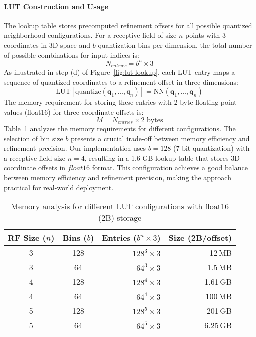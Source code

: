 \paragraph{LUT Construction and Usage}
The lookup table stores precomputed refinement offsets for all possible quantized neighborhood configurations. For a receptive field of size $n$ points with 3 coordinates in 3D space and $b$ quantization bins per dimension, the total number of possible combinations for input indices is:
\begin{equation}
N_{entries} = b^n \times 3
\end{equation}
As illustrated in step (d) of Figure~\ref{fig:lut-lookup}, each LUT entry maps a sequence of quantized coordinates to a refinement offset in three dimensions:
\begin{equation}
\text{LUT}[\text{quantize}(\mathbf{q}_1,\dots,\mathbf{q}_n)] = \text{NN}(\mathbf{q}_1,\dots,\mathbf{q}_n)
\end{equation}
The memory requirement for storing these entries with 2-byte floating-point values (float16) for three coordinate offsets is:
\begin{equation}
M = N_{entries} \times 2\text{ bytes}
\end{equation}
Table~\ref{tab:lut-size} analyzes the memory requirements for different configurations. The selection of bin size $b$ presents a crucial trade-off between memory efficiency and refinement precision. Our implementation uses $b=128$ (7-bit quantization) with a receptive field size $n=4$, resulting in a 1.6 GB lookup table that stores 3D coordinate offsets in $float16$ format. This configuration achieves a good balance between memory efficiency and refinement precision, making the approach practical for real-world deployment.
\begin{table}[t]
\centering
\begin{tabular}{@{}c c r r@{}}
\toprule
RF Size ($n$) & 
Bins ($b$) & 
Entries ($b^n \times 3$) & 
Size (2B/offset) \\ 
\midrule
3 & 128 & $128^3\times3$ & 12\,MB \\
3 & 64 & $64^3\times3$ & 1.5\,MB \\
\midrule
4 & 128 & $128^4\times3$ & 1.61\,GB \\
4 & 64 & $64^4\times3$ & 100\,MB \\
\midrule
5 & 128 & $128^5\times3$ & 201\,GB \\
5 & 64 & $64^5\times3$ & 6.25\,GB \\
\bottomrule
\end{tabular}
\vspace{-.1in}
\caption{Memory analysis for different LUT configurations with float16 (2B) storage}
\label{tab:lut-size}
\vspace{-.3in}
\end{table}

